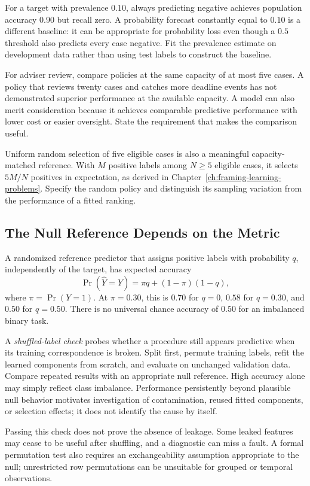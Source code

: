For a target with prevalence $0.10$, always predicting negative achieves population accuracy $0.90$ but recall zero. A probability forecast constantly equal to $0.10$ is a different baseline: it can be appropriate for probability loss even though a $0.5$ threshold also predicts every case negative. Fit the prevalence estimate on development data rather than using test labels to construct the baseline.

For adviser review, compare policies at the same capacity of at most five cases. A policy that reviews twenty cases and catches more deadline events has not demonstrated superior performance at the available capacity. A model can also merit consideration because it achieves comparable predictive performance with lower cost or easier oversight. State the requirement that makes the comparison useful.

Uniform random selection of five eligible cases is also a meaningful capacity-matched reference. With $M$ positive labels among $N\ge5$ eligible cases, it selects $5M/N$ positives in expectation, as derived in Chapter~\ref{ch:framing-learning-problems}. Specify the random policy and distinguish its sampling variation from the performance of a fitted ranking.

\subsection{The Null Reference Depends on the Metric}

A randomized reference predictor that assigns positive labels with probability $q$, independently of the target, has expected accuracy
\[
\Pr(\hat Y=Y)=\pi q+(1-\pi)(1-q),
\]
where $\pi=\Pr(Y=1)$. At $\pi=0.30$, this is $0.70$ for $q=0$, $0.58$ for $q=0.30$, and $0.50$ for $q=0.50$. There is no universal chance accuracy of $0.50$ for an imbalanced binary task.

A \emph{shuffled-label check} probes whether a procedure still appears predictive when its training correspondence is broken. Split first, permute training labels, refit the learned components from scratch, and evaluate on unchanged validation data. Compare repeated results with an appropriate null reference. High accuracy alone may simply reflect class imbalance. Performance persistently beyond plausible null behavior motivates investigation of contamination, reused fitted components, or selection effects; it does not identify the cause by itself.

Passing this check does not prove the absence of leakage. Some leaked features may cease to be useful after shuffling, and a diagnostic can miss a fault. A formal permutation test also requires an exchangeability assumption appropriate to the null; unrestricted row permutations can be unsuitable for grouped or temporal observations.


